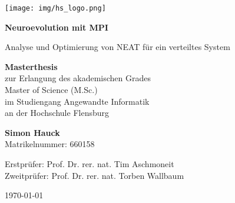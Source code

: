 \documentclass[12pt,a4paper]{scrreprt}
\begin{document}
\begin{titlepage}
	\begin{center}
		\texttt{[image: img/hs\_logo.png]}\par\vspace{0cm}
		\vspace{1.5cm}
		{\huge\bfseries Neuroevolution mit MPI \par}
		\vspace{0.5cm}
		{\LARGE Analyse und Optimierung von NEAT für ein verteiltes System\par}
		\vspace{2cm}
	\end{center}

	\begin{large}
		\noindent
		\textbf{Masterthesis}\\
		zur Erlangung des akademischen Grades\\
		Master of Science (M.Sc.)\\
		im Studiengang Angewandte Informatik\\
		an der Hochschule Flensburg
		\vspace{1cm}
	\end{large}
	
	\begin{large}
		\noindent
		\textbf{Simon Hauck}\\
		Matrikelnummer: 660158
		\vspace{1.0cm}
	\end{large}
	
	\begin{large}
		\noindent
		Erstprüfer: \hspace{1.0cm} Prof. Dr. rer. nat. Tim Aschmoneit \\
		Zweitprüfer: \hspace{0.7cm} Prof. Dr. rer. nat. Torben Wallbaum \\
	\end{large}
	\vspace{1.5cm}

	{\large \centering \today\par}
\end{titlepage}



\tableofcontents
\listoffigures


\newpage
{}








\printbibliography[
heading=bibintoc, 
title={Quellenverzeichnis}
]


\end{document}
